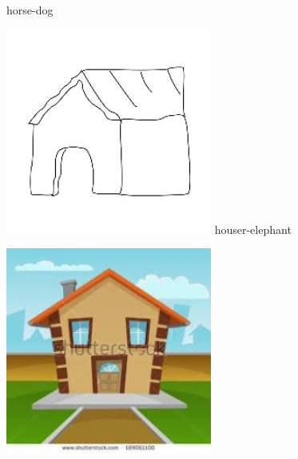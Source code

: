 \documentclass{article}
\begin{document}
\begin{center}
\begin{minipage}{0.142\textwidth}
        horse-dog
    \end{minipage}%
    \begin{minipage}{0.142\textwidth}
        \includegraphics[width=\linewidth]{./pic/misclassified_r5_p1_2723.jpg}
        houser-elephant
    \end{minipage}%
    \begin{minipage}{0.142\textwidth}
        \includegraphics[width=\linewidth]{./pic/misclassified_r5_p2_2723.jpg}

\end{minipage}
\end{center}
\end{document}
